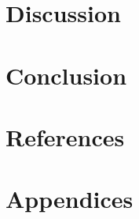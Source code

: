 \documentclass[a4paper,12pt]{article}
\let\stdsection\section
\renewcommand\section{\newpage\stdsection}
\begin{document}
\section{Discussion}

\section{Conclusion}

\section{References}


\section{Appendices}
\end{document}
